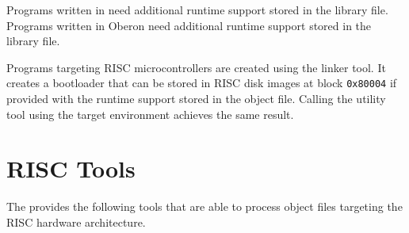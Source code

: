 Programs written in \cpp{} need additional runtime support stored in the  library file.
Programs written in Oberon need additional runtime support stored in the  library file.
\seecpp\seeoberon

Programs targeting RISC microcontrollers are created using the  linker tool.
It creates a bootloader that can be stored in RISC disk images at block \texttt{0x80004} if provided with the runtime support stored in the  object file.
Calling the  utility tool using the  target environment achieves the same result.

\section{RISC Tools}

The \ecs{} provides the following tools that are able to process object files targeting the RISC hardware architecture.
\interface

\cdrisc
\cpprisc
\falrisc
\obrisc
\riscasm
\riscdism
\linkbin

\concludechapter
